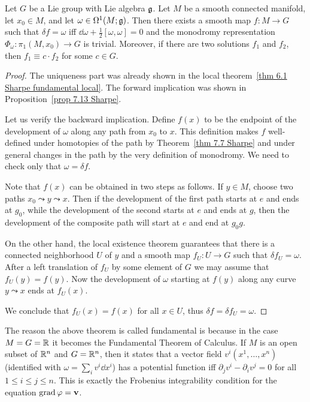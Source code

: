 \begin{thm}\label{thm 7.14 Sharpe fundamental global}
    Let $G$ be a Lie group with Lie algebra $\mathfrak{g}$. Let $M$ be a smooth connected manifold, let $x_0\in M$, and let $\omega \in\Omega^1(M;\mathfrak{g})$. Then there exists a smooth map $f:M\to G$ such that $\delta f=\omega$ iff $\dd\omega+\frac12[\omega,\omega]=0$ and the monodromy representation $\Phi_\omega:\pi_1(M,x_0)\to G$ is trivial. Moreover, if there are two solutions $f_1$ and $f_2$, then $f_1\equiv c\cdot f_2$ for some $c\in G$.
\end{thm}
\begin{proof}
    The uniqueness part was already shown in the local theorem~\ref{thm 6.1 Sharpe fundamental local}. The forward implication  was shown in Proposition~\ref{prop 7.13 Sharpe}.

    Let us verify the backward implication. Define $f(x)$ to be the endpoint of the development of $\omega$ along any path from $x_0$ to $x$. This definition makes $f$ well-defined under homotopies of the path by Theorem~\ref{thm 7.7 Sharpe} and under general changes in the path by the very definition of monodromy. We need to check only that $\omega=\delta f$.

    Note that $f(x)$ can be obtained in two steps as follows. If $y\in M$, choose two paths $x_0\leadsto y\leadsto x$. Then if the development of the first path starts at $e$ and ends at $g_0$, while the development of the second starts at $e$ and ends at $g$, then the development of the composite path will start at $e$ and end at $g_0g$. 
    
    On the other hand, the local existence theorem guarantees that there is a connected neighborhood $U$ of $y$ and a smooth map $f_U:U\to G$ such that $\delta f_U=\omega$. After a left translation of $f_U$ by some element of $G$ we may assume that $f_U(y)=f(y)$. Now the development of $\omega$ starting at $f(y)$ along any curve $y\leadsto x$ ends at $f_U(x)$. 
    
    We conclude that $f_U(x)=f(x)$ for all $x\in U$, thus $\delta f=\delta f_U=\omega$.
\end{proof}

\begin{rem}
    The reason the above theorem is called fundamental is because in the case $M=G=\mathbb{R}$ it becomes the Fundamental Theorem of Calculus. If $M$ is an open subset of $\mathbb{R}^n$ and $G=\mathbb{R}^n$, then it states that a vector field $v^i(x^1,\ldots,x^n)$ (identified with $\omega=\sum_iv^i\dd x^i$) has a potential function iff $\partial_j v^i-\partial_i v^j=0$ for all $1\leq i\leq j\leq n$. This is exactly the Frobenius integrability condition for the equation $\operatorname{grad} \varphi=\mathbf{v}$.
\end{rem}

